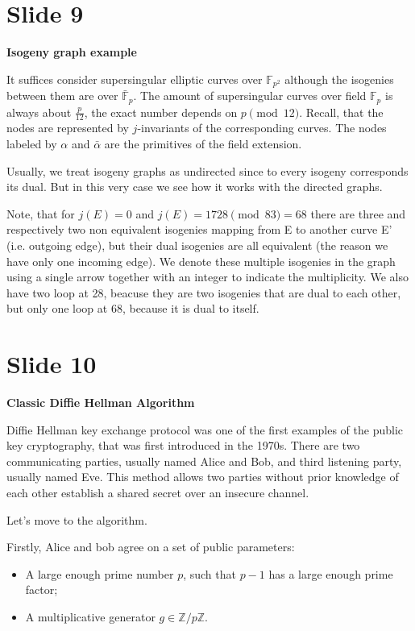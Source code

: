 \documentclass[10 pt]{article}
\begin{document}
\section{Slide 9} \large{\textbf{Isogeny graph example}
	
It suffices consider supersingular elliptic curves over $\mathbb{F}_{p^2}$ although the isogenies between them are over $\bar{\mathbb{F}}_p$. The amount of supersingular curves over field $\mathbb{F}_p$ is always about $\frac{p}{12}$, the exact number depends on $p \pmod{12}$. Recall, that the nodes are represented by $j$-invariants of the corresponding curves. The nodes labeled by $\alpha$ and $\bar{\alpha}$ are the primitives of the field extension. 

Usually, we treat isogeny graphs as undirected since to every isogeny corresponds its dual. But in this very case we see how it works with the directed graphs.

Note, that for $j(E) = 0$ and $j(E) = 1728 \pmod{83} = 68$ there are three and respectively two non equivalent isogenies mapping from E to another curve E' (i.e. outgoing edge), but their dual isogenies are all equivalent (the reason we have only one incoming edge). We denote these multiple isogenies in the graph using a single arrow together with an integer to indicate the multiplicity.
We also have two loop at 28, beacuse they are two isogenies that are dual to each other, but only one loop at 68, because it is dual to itself. 
 
\section{Slide 10} \large{\textbf{Classic Diffie Hellman Algorithm}}

Diffie Hellman key exchange protocol was one of the first examples of the public key cryptography, that was first introduced in the 1970s. There are two communicating parties, usually named Alice and Bob, and third listening party, usually named Eve. This method allows two parties without prior knowledge of each other establish a shared secret over an insecure channel. 

Let's move to the algorithm.

 
Firstly, Alice and bob agree on a set of public parameters:
\begin{itemize}
	\item A large enough prime number $p$, such that $p - 1$ has a large enough prime factor;
	
	\item A multiplicative generator $g \in \mathbb{Z}/p\mathbb{Z}$.
	

\end{itemize}}
\end{document}
